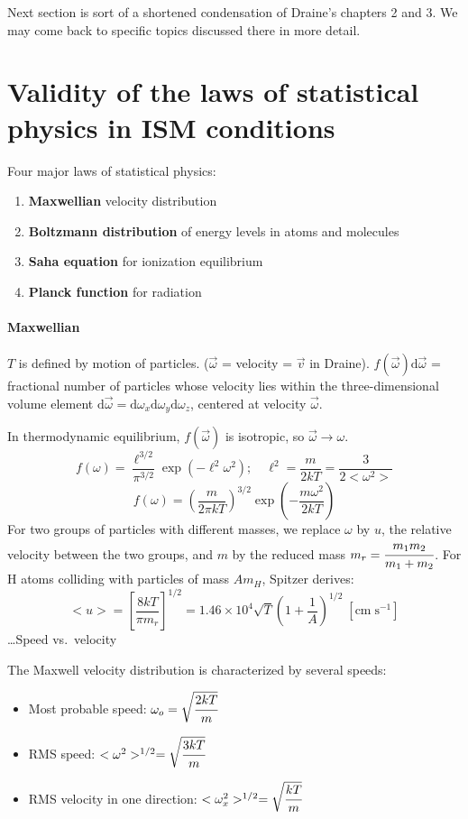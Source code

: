 \documentclass[12pt]{article}
\newcommand{\mar}[1]{\hspace{0pt}\marginpar{-\textcolor{black}{#1}-}}
\begin{document}
Next\mar{16} section is sort of a shortened condensation of Draine's chapters
2 and 3. We may come back to specific topics discussed there in more
detail.
\section{Validity of the laws of statistical physics in ISM conditions}
Four major laws of statistical physics:
\begin{enumerate}
    \item \textbf{Maxwellian} velocity distribution
    \item \textbf{Boltzmann distribution} of energy levels in atoms and molecules
    \item \textbf{Saha equation} for ionization equilibrium
    \item \textbf{Planck function} for radiation
\end{enumerate}

\paragraph{Maxwellian} $T$ is defined by motion of particles.
($\vec{\omega}$ = velocity = $\vec{v}$ in Draine).
$f(\vec{\omega})\mathrm{d}\vec{\omega}$ = fractional number of
particles whose velocity lies within the three-dimensional volume element
$\mathrm{d}\vec{\omega} =
\mathrm{d}\omega_{x}\mathrm{d}\omega_{y}\mathrm{d}\omega_{z}$,
centered at velocity $\vec{\omega}$.

In thermodynamic equilibrium, $f(\vec{\omega})$ is isotropic, so
$\vec{\omega} \rightarrow \omega$.
$${ f(\omega) =
    \frac{\ell^{3/2}}{\pi^{3/2}}\exp(-\ell^{2}\omega^{2});\quad
    \ell^{2} = \frac{m}{2kT} = \frac{3}{2<\omega^{2}>}
}$$ $${
    f(\omega) = \left(\frac{m}{2\pi kT}\right)^{3/2}
    \exp\left(-\frac{m\omega^{2}}{2kT}\right)
}$$
For two groups of particles with different masses, we replace $\omega$
by $u$, the relative velocity between the two groups, and $m$ by the
reduced mass $m_{r} = \cfrac{m_{1}m_{2}}{m_{1}+m_{2}}$.
For\mar{17} H atoms colliding with particles of mass $Am_{H}$,
Spitzer derives:$${
    <u> = \left[\frac{8kT}{\pi m_{r}}\right]^{1/2}
    = 1.46\times10^{4}\sqrt{T}\left(1+\frac{1}{A}\right)^{1/2}\;
    [\mathrm{cm\; s}^{-1}]
}$$
\ldots Speed vs.\ velocity

The Maxwell velocity distribution is characterized by several speeds:
\begin{itemize}[itemsep=1ex]
    \item Most probable speed: $\omega_{o} = \sqrt{\cfrac{2kT}{m}}$
    \item RMS speed: $<\omega^{2}>^{1/2} = \sqrt{\cfrac{3kT}{m}}$
    \item RMS velocity in one direction:
        $<\omega_{x}^{2}>^{1/2} = \sqrt{\cfrac{kT}{m}}$
\end{itemize}
\end{document}
